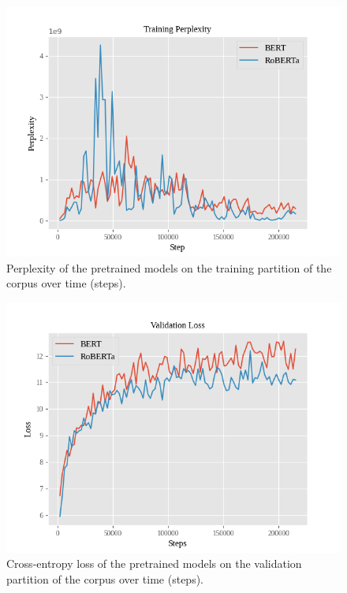 \documentclass[12pt]{article}
\begin{document}
\begin{figure}[!t]
    \includegraphics[width=\linewidth]{figures/pretrained_training_ppl.png}
    \caption{Perplexity of the pretrained models on the training partition of the corpus over time (steps).}
    \label{fig:pretrained_training_ppl}
\end{figure}

\begin{figure}[!t]
    \includegraphics[width=\linewidth]{figures/pretrained_validation_loss.png}
    \caption{Cross-entropy loss of the pretrained models on the validation partition of the corpus over time (steps).}
    \label{fig:pretrained_validation_loss}
\end{figure}
\end{document}
